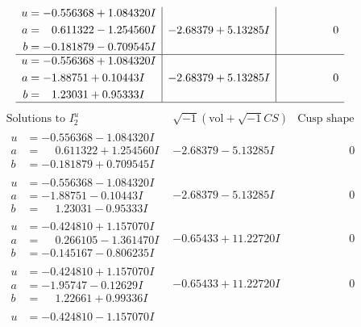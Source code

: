 \documentclass[1p]{elsarticle_modified}
\theoremstyle{definition}
\newcommand{\I}{\sqrt{-1}}
\begin{document}
$$\begin{array}{c|c|c}
\begin{aligned}
u &= -0.556368 + 1.084320 I \\
a &= \phantom{-}0.611322 - 1.254560 I \\
b &= -0.181879 - 0.709545 I\end{aligned}
 & -2.68379 + 5.13285 I & \phantom{-0.000000 } 0 \\ \hline\begin{aligned}
u &= -0.556368 + 1.084320 I \\
a &= -1.88751 + 0.10443 I \\
b &= \phantom{-}1.23031 + 0.95333 I\end{aligned}
 & -2.68379 + 5.13285 I & \phantom{-0.000000 } 0\\
 \hline 
 \end{array}$$\newpage$$\begin{array}{c|c|c}  
\text{Solutions to }I^u_{2}& \I (\text{vol} + \sqrt{-1}CS) & \text{Cusp shape}\\
 \hline 
\begin{aligned}
u &= -0.556368 - 1.084320 I \\
a &= \phantom{-}0.611322 + 1.254560 I \\
b &= -0.181879 + 0.709545 I\end{aligned}
 & -2.68379 - 5.13285 I & \phantom{-0.000000 } 0 \\ \hline\begin{aligned}
u &= -0.556368 - 1.084320 I \\
a &= -1.88751 - 0.10443 I \\
b &= \phantom{-}1.23031 - 0.95333 I\end{aligned}
 & -2.68379 - 5.13285 I & \phantom{-0.000000 } 0 \\ \hline\begin{aligned}
u &= -0.424810 + 1.157070 I \\
a &= \phantom{-}0.266105 - 1.361470 I \\
b &= -0.145167 - 0.806235 I\end{aligned}
 & -0.65433 + 11.22720 I & \phantom{-0.000000 } 0 \\ \hline\begin{aligned}
u &= -0.424810 + 1.157070 I \\
a &= -1.95747 - 0.12629 I \\
b &= \phantom{-}1.22661 + 0.99336 I\end{aligned}
 & -0.65433 + 11.22720 I & \phantom{-0.000000 } 0 \\ \hline\begin{aligned}
u &= -0.424810 - 1.157070 I \\

\end{aligned}
\end{array}$$
\end{document}
